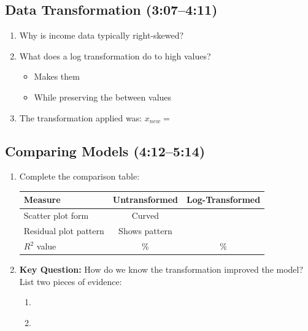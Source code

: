 \documentclass[11pt]{article}
\begin{document}
\subsection*{Data Transformation (3:07--4:11)}
\begin{enumerate}[resume, label=\arabic*.]
\item Why is income data typically right-skewed?

\vspace{1.5em}

\item What does a log transformation do to high values?
\begin{itemize}
\item Makes them \underline{\hspace{1.5in}}
\item While preserving the \underline{\hspace{1.5in}} between values
\end{itemize}

\item The transformation applied was: $x_{new} = $ \underline{\hspace{1in}}
\end{enumerate}

\subsection*{Comparing Models (4:12--5:14)}
\begin{enumerate}[resume, label=\arabic*.]
\item Complete the comparison table:

\begin{center}
\begin{tabular}{|l|c|c|}
\hline
\textbf{Measure} & \textbf{Untransformed} & \textbf{Log-Transformed} \\
\hline
Scatter plot form & Curved & \underline{\hspace{1.2in}} \\
\hline
Residual plot pattern & Shows pattern & \underline{\hspace{1.2in}} \\
\hline
$R^2$ value & \underline{\hspace{0.6in}}\% & \underline{\hspace{0.6in}}\% \\
\hline
\end{tabular}
\end{center}

\item \textbf{Key Question:} How do we know the transformation improved the model? List two pieces of evidence:
\begin{enumerate}[label=\alph*)]
\item \underline{\hspace{4in}}
\item \underline{\hspace{4in}}
\end{enumerate}
\end{enumerate}
\end{document}
